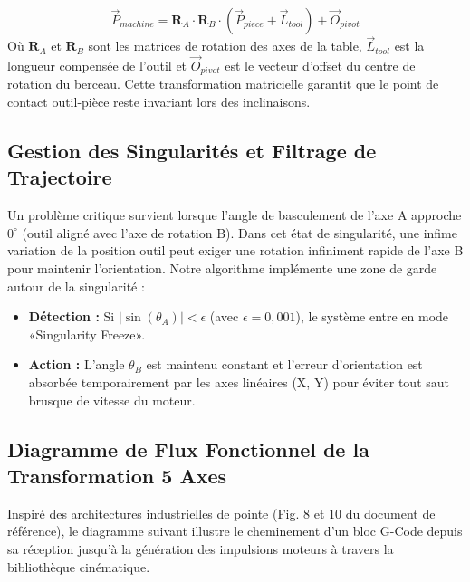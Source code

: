 \begin{equation}
    \vec{P}_{machine} = \mathbf{R}_A \cdot \mathbf{R}_B \cdot (\vec{P}_{piece} + \vec{L}_{tool}) + \vec{O}_{pivot}
\end{equation}
Où $\mathbf{R}_A$ et $\mathbf{R}_B$ sont les matrices de rotation des axes de la table, $\vec{L}_{tool}$ est la longueur compensée de l'outil et $\vec{O}_{pivot}$ est le vecteur d'offset du centre de rotation du berceau. Cette transformation matricielle garantit que le point de contact outil-pièce reste invariant lors des inclinaisons.

\subsection{Gestion des Singularités et Filtrage de Trajectoire}
Un problème critique survient lorsque l'angle de basculement de l'axe A approche $0^\circ$ (outil aligné avec l'axe de rotation B). Dans cet état de singularité, une infime variation de la position outil peut exiger une rotation infiniment rapide de l'axe B pour maintenir l'orientation. 
Notre algorithme implémente une zone de garde autour de la singularité :
\begin{itemize}
    \item \textbf{Détection :} Si $|\sin(\theta_A)| < \epsilon$ (avec $\epsilon = 0{,}001$), le système entre en mode «Singularity Freeze».
    \item \textbf{Action :} L'angle $\theta_B$ est maintenu constant et l'erreur d'orientation est absorbée temporairement par les axes linéaires (X, Y) pour éviter tout saut brusque de vitesse du moteur.
\end{itemize}


    \subsection{Diagramme de Flux Fonctionnel de la Transformation 5 Axes}
Inspiré des architectures industrielles de pointe (Fig. 8 et 10 du document de référence), le diagramme suivant illustre le cheminement d'un bloc G-Code depuis sa réception jusqu'à la génération des impulsions moteurs à travers la bibliothèque cinématique.

